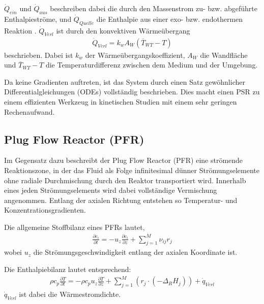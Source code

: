             $\dot Q_{ein}$ und $\dot Q_{aus}$ beschreiben dabei die durch den Massenstrom zu- bzw. abgeführte Enthalpieströme, und $\dot Q_{Quelle}$ die Enthalpie aus einer exo- bzw. endothermen Reaktion \cite{Emig_Klemm_2017}. $\dot Q_{Verl}$ ist durch den konvektiven Wärmeübergang 
            \begin{align}
                \dot Q_{Verl} = k_w A_W (\overline{T}_{WT} - T) 
            \end{align}
            beschrieben. Dabei ist $k_w$ der Wärmeübergangskoeffizient, $A_W$ die Wandfläche und $\overline{T}_{WT} - T$ die Temperaturdifferenz zwischen dem Medium und der Umgebung.
            
            Da keine Gradienten auftreten, ist das System durch einen Satz gewöhnlicher Differentialgleichungen (ODEs) vollständig beschrieben. Dies macht einen PSR zu einem effizienten Werkzeug in kinetischen Studien mit einem sehr geringen Rechenaufwand.
            
        \subsection{Plug Flow Reactor (PFR)}

            Im Gegensatz dazu beschreibt der Plug Flow Reactor (PFR) eine strömende Reaktionszone, in der das Fluid als Folge infinitesimal dünner Strömungselemente ohne radiale Durchmischung durch den Reaktor transportiert wird. Innerhalb eines jeden Strömungselements wird dabei vollständige Vermischung angenommen. Entlang der axialen Richtung entstehen so Temperatur- und Konzentrationsgradienten. 

            Die allgemeine Stoffbilanz eines PFRs lautet,
            \begin{align}
                \frac{\partial c_i}{\partial t} = -u_z \frac{\partial c_i}{\partial z} + \sum_{j=1}^M \nu_{ij}r_j
            \end{align}
            wobei $u_z$ die Strömungsgeschwindigkeit entlang der axialen Koordinate ist.

            Die Enthalpiebilanz lautet entsprechend:
            \begin{align}
                \rho c_p \frac{\partial T}{\partial t} = -\rho c_p u_z \frac{\partial T}{\partial z} + \sum_{j=1}^M (r_j\cdot (-\Delta_RH_j)) + \dot q_{Verl}
            \end{align}
            $\dot q_{Verl}$ ist dabei die Wärmestromdichte. 

